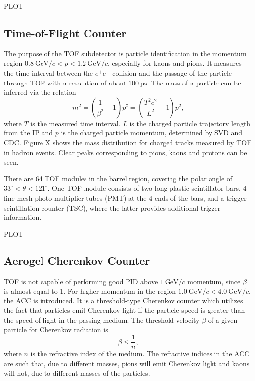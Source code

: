 \documentclass[headings=standardclasses,headings=big,oneside,a4paper,openany,12pt]{scrbook}
\newcommand {\e}[1]{\mathrm{~#1}}
\begin{document}
PLOT

\subsection{Time-of-Flight Counter}

The purpose of the TOF subdetector is particle identification in the momentum region $0.8\e{GeV}/c < p < 1.2\e{GeV}/c$, especially for kaons and pions. It measures the time interval between the $e^+e^-$ collision and the passage of the particle through TOF with a resolution of about $100\e{ps}$. The mass of a particle can be inferred via the relation
\begin{equation}
m^2 = \left( \frac{1}{\beta^2}-1\right)p^2 = \left( \frac{T^2c^2}{L^2}-1\right)p^2,
\end{equation}
where $T$ is the measured time interval, $L$ is the charged particle trajectory length from the IP and $p$ is the charged particle momentum, determined by SVD and CDC. Figure X shows the mass distribution for charged tracks measured by TOF in hadron events. Clear peaks corresponding to pions, kaons and protons can be seen.

There are 64 TOF modules in the barrel region, covering the polar angle of $33^\circ < \theta < 121^\circ$. One TOF module consists of two long plastic scintillator bars, 4 fine-mesh photo-multiplier tubes (PMT) at the 4 ends of the bars, and a trigger scintillation counter (TSC), where the latter provides additional trigger information.

PLOT


\subsection{Aerogel Cherenkov Counter} %
TOF is not capable of performing good PID above $1\e{GeV}/c$ momentum, since $\beta$ is almost equal to 1. For higher momentum in the region $1.0\e{GeV}/c < 4.0\e{GeV}/c$, the ACC is introduced. It is a threshold-type Cherenkov counter which utilizes the fact that particles emit Cherenkov light if the particle speed is greater than the speed of light in the passing medium. The threshold velocity $\beta$ of a given particle for Cherenkov radiation is
\begin{equation}
\beta \leq \frac{1}{n},
\end{equation}
where $n$ is the refractive index of the medium. The refractive indices in the ACC are such that, due to different masses, pions will emit Cherenkov light and kaons will not, due to different masses of the particles. 
\end{document}
